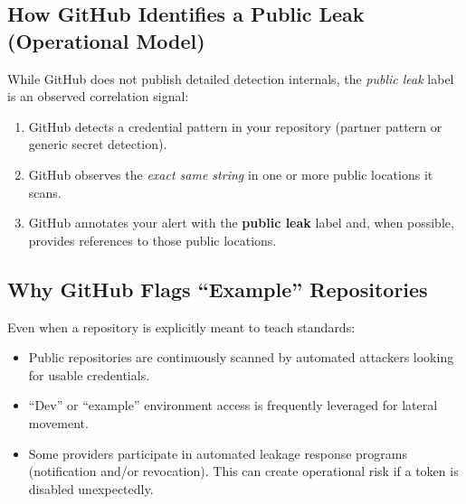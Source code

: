 \documentclass[11pt]{article}
\providecommand{\term}[1]{\textbf{#1}}
\begin{document}
\subsection{How GitHub Identifies a Public Leak (Operational Model)}
While GitHub does not publish detailed detection internals, the \emph{public leak} label is an observed correlation signal:
\begin{enumerate}
  \item GitHub detects a credential pattern in your repository (partner pattern or generic secret detection).
  \item GitHub observes the \emph{exact same string} in one or more public locations it scans.
  \item GitHub annotates your alert with the \term{public leak} label and, when possible, provides references to those public locations.
\end{enumerate}

\subsection{Why GitHub Flags ``Example'' Repositories}
Even when a repository is explicitly meant to teach standards:
\begin{itemize}
  \item Public repositories are continuously scanned by automated attackers looking for usable credentials.
  \item ``Dev'' or ``example'' environment access is frequently leveraged for lateral movement.
  \item Some providers participate in automated leakage response programs (notification and/or revocation). This can create operational risk if a token is disabled unexpectedly.
\end{itemize}
\end{document}
